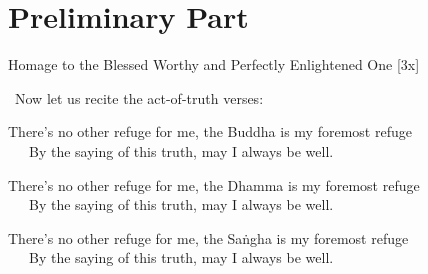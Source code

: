 \suttaRef{[Trad]}

\clearpage



\section{Preliminary Part}
\label{pubba-bhaga-english}

Homage to the Blessed Worthy and Perfectly Enlightened One \hfill{[3x]}

\begin{center}
	\anglebracketleft\ \hspace{-0.5mm}Now let us recite the act-of-truth verses: \hspace{-0.5mm}\anglebracketright\
\end{center}

\begin{hanging-indent}
There's no other refuge for me, the Buddha is my foremost refuge\\
By the saying of this truth, may I always be well.
\end{hanging-indent}

\begin{hanging-indent}
There's no other refuge for me, the Dhamma is my foremost refuge\\
By the saying of this truth, may I always be well.
\end{hanging-indent}

\begin{hanging-indent}
There's no other refuge for me, the Saṅgha is my foremost refuge\\
By the saying of this truth, may I always be well.
\end{hanging-indent}

\suttaRef{[Trad]}

\clearpage

